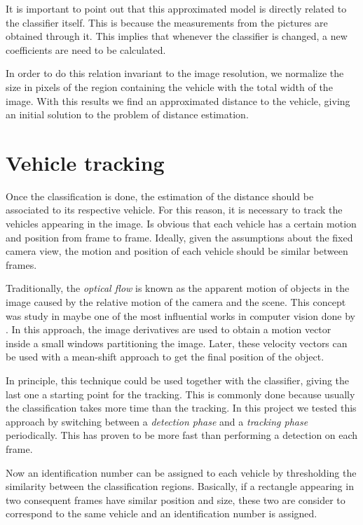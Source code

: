 It is important to point out that this approximated model is directly related to
the classifier itself. This is because the measurements from the pictures are
obtained through it. This implies that whenever the classifier is changed, a new
coefficients are need to be calculated.

In order to do this relation invariant to the image resolution, we normalize the
size in pixels of the region containing the vehicle with the total width of the
image. With this results we find  an approximated distance to the
vehicle, giving an initial solution to the problem of distance estimation.


\section{Vehicle tracking} %
\label{sec:vehicle-tracking}

Once the classification is done, the estimation of the distance should be
associated to its respective vehicle. For this reason, it is necessary to track
the vehicles appearing in the image. Is obvious that each vehicle has 
a certain motion and position from frame to frame. Ideally, given the
assumptions about the fixed camera view, the motion and position of each
vehicle should be similar between frames.

Traditionally, the \textit{optical flow} is known as the apparent motion of
objects in the image caused by the relative motion of the camera and the scene.
This concept was study in maybe one of the most influential works in computer 
vision done by \cite{lucas-kanade}. In this approach, the image derivatives are
used to obtain a motion vector inside a small windows partitioning the image. 
Later, these velocity vectors can be used with a mean-shift approach to get 
the final position of the object.

In principle, this technique could be used together with the classifier, giving
the last one a starting point for the tracking. This is commonly done because
usually the classification takes more time than the tracking. In this project we
tested this approach by switching between a \textit{detection phase} and a
\textit{tracking phase} periodically. This has proven to be more fast than
performing a detection on each frame.

Now an identification number can be assigned to each vehicle by
thresholding the similarity between the classification regions. Basically, if a 
rectangle appearing in two consequent frames have similar position and size, these
two are consider to correspond to the same vehicle and an identification number
is assigned. 

